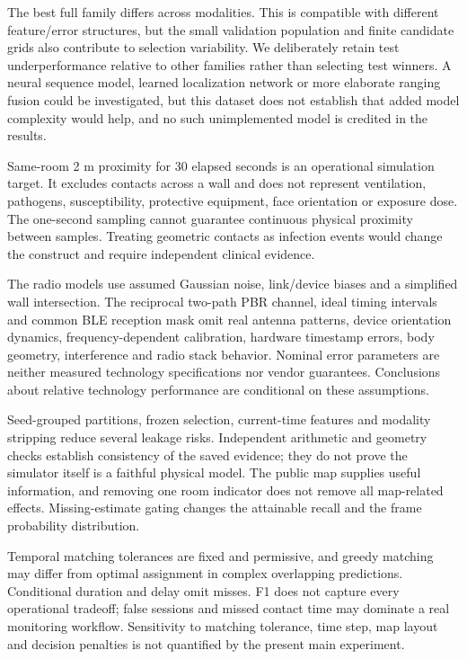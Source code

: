 \documentclass[12pt,a4paper]{report}
\begin{document}
The best full family differs across modalities. This is compatible with different feature/error structures, but the small validation population and finite candidate grids also contribute to selection variability. We deliberately retain test underperformance relative to other families rather than selecting test winners. A neural sequence model, learned localization network or more elaborate ranging fusion could be investigated, but this dataset does not establish that added model complexity would help, and no such unimplemented model is credited in the results.

Same-room 2 m proximity for 30 elapsed seconds is an operational simulation target. It excludes contacts across a wall and does not represent ventilation, pathogens, susceptibility, protective equipment, face orientation or exposure dose. The one-second sampling cannot guarantee continuous physical proximity between samples. Treating geometric contacts as infection events would change the construct and require independent clinical evidence.

The radio models use assumed Gaussian noise, link/device biases and a simplified wall intersection. The reciprocal two-path PBR channel, ideal timing intervals and common BLE reception mask omit real antenna patterns, device orientation dynamics, frequency-dependent calibration, hardware timestamp errors, body geometry, interference and radio stack behavior. Nominal error parameters are neither measured technology specifications nor vendor guarantees. Conclusions about relative technology performance are conditional on these assumptions.

Seed-grouped partitions, frozen selection, current-time features and modality stripping reduce several leakage risks. Independent arithmetic and geometry checks establish consistency of the saved evidence; they do not prove the simulator itself is a faithful physical model. The public map supplies useful information, and removing one room indicator does not remove all map-related effects. Missing-estimate gating changes the attainable recall and the frame probability distribution.

Temporal matching tolerances are fixed and permissive, and greedy matching may differ from optimal assignment in complex overlapping predictions. Conditional duration and delay omit misses. F1 does not capture every operational tradeoff; false sessions and missed contact time may dominate a real monitoring workflow. Sensitivity to matching tolerance, time step, map layout and decision penalties is not quantified by the present main experiment.
\end{document}
